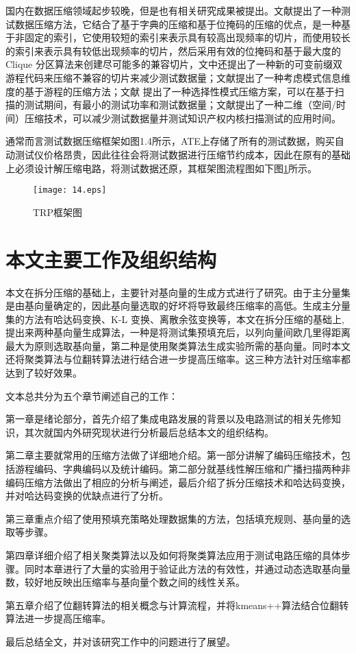 国内在数据压缩领域起步较晚，但是也有相关研究成果被提出。文献\cite{48}提出了一种测试数据压缩方法，它结合了基于字典的压缩和基于位掩码的压缩的优点，是一种基于非固定的索引，它使用较短的索引来表示具有较高出现频率的切片，而使用较长的索引来表示具有较低出现频率的切片，然后采用有效的位掩码和基于最大度的 Clique 分区算法来创建尽可能多的兼容切片，文中还提出了一种新的可变前缀双游程代码来压缩不兼容的切片来减少测试数据量；文献\cite{49}提出了一种考虑模式信息维度的基于游程的压缩方法；文献\cite{50} 提出了一种选择性模式压缩方案，可以在基于扫描的测试期间，有最小的测试功率和测试数据量；文献\cite{51}提出了一种二维（空间/时间）压缩技术，可以减少测试数据量并测试知识产权内核扫描测试的应用时间。

通常而言测试数据压缩框架如图1.4所示，ATE上存储了所有的测试数据，购买自动测试仪价格昂贵，因此往往会将测试数据进行压缩节约成本\cite{36,37,38}，因此在原有的基础上必须设计解压缩电路，将测试数据还原，其框架图流程图如下图\ref{14}所示。

\begin{figure}[H]
  \centering
  \texttt{[image: 14.eps]}
  \caption{TRP框架图}\label{14}
     \end{figure}

\section{本文主要工作及组织结构}

本文在拆分压缩的基础上，主要针对基向量的生成方式进行了研究。由于主分量集是由基向量确定的，因此基向量选取的好坏将导致最终压缩率的高低。生成主分量集的方法有哈达码变换、K-L 变换、离散余弦变换等，本文在拆分压缩的基础上,提出来两种基向量生成算法，一种是将测试集预填充后，以列向量间欧几里得距离最大为原则选取基向量，第二种是使用聚类算法生成实验所需的基向量。同时本文还将聚类算法与位翻转算法进行结合进一步提高压缩率。这三种方法针对压缩率都达到了较好效果。

文本总共分为五个章节阐述自己的工作：

第一章是绪论部分，首先介绍了集成电路发展的背景以及电路测试的相关先修知识，其次就国内外研究现状进行分析最后总结本文的组织结构。

第二章主要就常用的压缩方法做了详细地介绍。第一部分讲解了编码压缩技术，包括游程编码、字典编码以及统计编码。第二部分就基线性解压缩和广播扫描两种非编码压缩方法做出了相应的分析与阐述，最后介绍了拆分压缩技术和哈达码变换，并对哈达码变换的优缺点进行了分析。

第三章重点介绍了使用预填充策略处理数据集的方法，包括填充规则、基向量的选取等步骤。

第四章详细介绍了相关聚类算法以及如何将聚类算法应用于测试电路压缩的具体步骤。同时本章进行了大量的实验用于验证此方法的有效性，并通过动态选取基向量数，较好地反映出压缩率与基向量个数之间的线性关系。

第五章介绍了位翻转算法的相关概念与计算流程，并将kmeans++算法结合位翻转算法进一步提高压缩率。

最后总结全文，并对该研究工作中的问题进行了展望。
